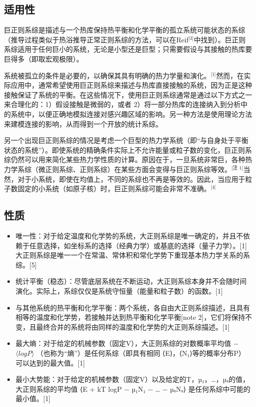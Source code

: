 \subsection{适用性}  
巨正则系综是描述与一个热库保持热平衡和化学平衡的孤立系统可能状态的系综（推导过程类似于热浴推导正常正则系综的方法，可以在Reif\(^\text{[3]}\)中找到）。巨正则系综适用于任何巨小的系统，无论是小型还是巨型；只需要假设与其接触的热库要巨得多（即取宏观极限）。

系统被孤立的条件是必要的，以确保其具有明确的热力学量和演化。\(^\text{[1]}\)然而，在实际应用中，通常希望使用巨正则系综来描述与热库直接接触的系统，因为正是这种接触保证了系统的平衡。在这些情况下，使用巨正则系综通常是通过以下方式之一来合理化的：1）假设接触是微弱的，或者 2）将一部分热库的连接纳入到分析中的系统中，以便正确地模拟连接对感兴趣区域的影响。另一种方法是使用理论方法来建模连接的影响，从而得到一个开放的统计系综。

另一个出现巨正则系综的情况是考虑一个巨型的热力学系统（即“与自身处于平衡状态的系统”）。即使系统的精确条件实际上不允许能量或粒子数的变化，巨正则系综仍然可以用来简化某些热力学性质的计算。原因在于，一旦系统非常巨，各种热力学系综（微正则系综、正则系综）在某些方面会变得与巨正则系综等效。\(^\text{[注 1]}\)当然，对于小系统，即使在均值上，不同的系综也不再是等效的。因此，当应用于粒子数固定的小系统（如原子核）时，巨正则系综可能会非常不准确。\(^\text{[4]}\)
\subsection{性质}  
\begin{itemize}
\item 唯一性：对于给定温度和化学势的系统，大正则系综是唯一确定的，并且不依赖于任意选择，如坐标系的选择（经典力学）或基底的选择（量子力学）。[1] 大正则系综是唯一一个在常温、常体积和常化学势下重现基本热力学关系的系综。[5]  
\item 统计平衡（稳态）：尽管底层系统在不断运动，大正则系综本身并不会随时间演化。实际上，系综仅仅是系统守恒量（能量和粒子数）的函数。[1]  
\item 与其他系统的热平衡和化学平衡：两个系统，各自由大正则系综描述，且具有相等的温度和化学势，若接触并达到热平衡和化学平衡[note 2]，它们将保持不变，且最终合并的系统将由同样的温度和化学势的大正则系综描述。[1]  
\item 最大熵：对于给定的机械参数（固定V），大正则系综的对数概率平均值  
−\(⟨log⁡P⟩\)  
（也称为“熵”）是任何系综（即具有相同  
⟨E⟩，⟨N₁⟩等的概率分布P）可以达到的最大值。[1]  
\item 最小大势能：对于给定的机械参数（固定V）以及给定的T，µ₁，…，µₛ的值，大正则系综的平均值  
⟨E + kT log⁡P − µ₁N₁ − … − µₛNₛ⟩  
是任何系综中可能的最小值。[1]
\end{itemize}